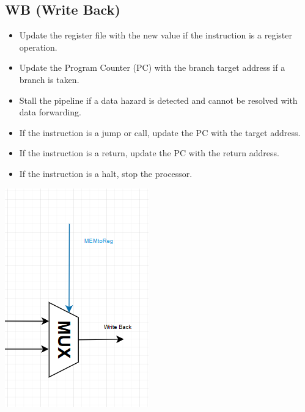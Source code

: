 \documentclass{report}
\begin{document}
\subsection*{WB (Write Back)}
\begin{minipage}{0.6\textwidth}
\begin{itemize}
    \item Update the register file with the new value if the instruction is a register operation.
    \item Update the Program Counter (PC) with the branch target address if a branch is taken.
    \item Stall the pipeline if a data hazard is detected and cannot be resolved with data forwarding.
    \item If the instruction is a jump or call, update the PC with the target address.
    \item If the instruction is a return, update the PC with the return address.
    \item If the instruction is a halt, stop the processor.
\end{itemize}
\end{minipage}
\begin{minipage}{0.35\textwidth}
\begin{center}
    \includegraphics[width=\textwidth]{./assets/WB.png}
\end{center}
\end{minipage}
\end{document}
